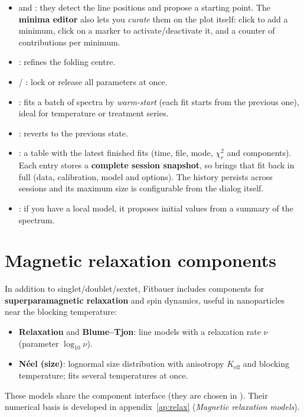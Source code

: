\begin{itemize}[nosep]
  \item {} and : they detect the line positions and propose a starting
        point. The \textbf{minima editor} also lets you \emph{curate} them
        on the plot itself: click to add a minimum, click on a
        marker to activate/deactivate it, and a counter of contributions per
        minimum.
  \item {}: refines the folding centre.
  \item {} / : lock or release
        all parameters at once.
  \item {}: fits a batch of spectra by
        \emph{warm-start} (each fit starts from the previous one), ideal for
        temperature or treatment series.
  \item {}: reverts to the previous state.
  \item {}: a table with the latest finished fits
        (time, file, mode, $\chi^2_r$ and components). Each entry stores a
        \textbf{complete session snapshot}, so  brings that
        fit back in full (data, calibration, model and options). The history
        persists across sessions and its maximum size is configurable from
        the dialog itself.
  \item {}: if you have a
        local model, it proposes initial values from a summary of the spectrum.
\end{itemize}


\section{Magnetic relaxation components}

In addition to singlet/doublet/sextet, Fitbauer includes components for
\textbf{superparamagnetic relaxation} and spin dynamics, useful in
nanoparticles near the blocking temperature:

\begin{itemize}[nosep]
  \item \textbf{Relaxation} and \textbf{Blume--Tjon}: line models with a
        relaxation rate $\nu$ (parameter $\log_{10}\nu$).
  \item \textbf{Néel (size)}: lognormal size distribution with anisotropy
        $K_{\text{eff}}$ and blocking temperature;  fits several temperatures at once.
\end{itemize}

\begin{nota}
These models share the component interface (they are chosen in ).
Their numerical basis is developed in appendix~\ref{ap:relax} (\emph{Magnetic
relaxation models}).
\end{nota}
